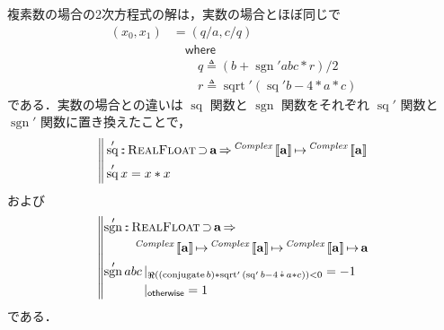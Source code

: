 \documentclass[a5paper,twoside,fleqn]{jsbook}
\def\[{\left[\!\left[}
\def\]{\right]\!\right]}
\DeclareMathOperator{\sgn}{sgn}
\newcommand{\mBrace}{\Vert}
\newcommand{\mKeyword}[1]{\mathsf{#1}} %
\newcommand{\mOtherwiseKeyword}{\mKeyword{otherwise}}
\newcommand{\mWhereKeyword}{\mKeyword{where}}
\DeclareMathOperator{\mOtherwise}{\mOtherwiseKeyword}
\DeclareMathOperator{\mSuperClass}{\Rightarrow}
\DeclareMathOperator{\mSuperSet}{\supset}
\DeclareMathOperator{\mWhere}{\mWhereKeyword}
\newcommand{\mSpecialFunc}[1]{\mathrm{#1}}
\DeclareMathOperator{\mConjugate}{\mSpecialFunc{conjugate}}
\DeclareMathOperator{\mRealPart}{\Re}
\DeclareMathOperator{\mSq}{\mSpecialFunc{sq}}
\DeclareMathOperator{\mSqrtFunc}{\mSpecialFunc{sqrt}}
\DeclareMathOperator{\mComplexTimes}{\Dot\ast}
\DeclareMathOperator{\mIn}{{:\!:}}
\DeclareMathOperator{\mLetEq}{\triangleq}
\DeclareMathOperator{\mMapsTo}{\mapsto}
\newcommand{\mType}[1]{\mathbf{#1}}
\newcommand{\mGenericTypeAssemble}[2]{{}^{\mTypeConstructor{#1}}\[\mType{#2}\]}
\newcommand{\mComplexType}[1]{\mGenericTypeAssemble{Complex}{#1}}
\newcommand{\mTypeConstructor}[1]{\textit{#1}}
\newcommand{\mTupleWith}[1]{\left(#1\right)}
\newcommand{\mGenericTypeClass}[1]{\textsc{#1}} %
\newcommand{\mRealFloatTypeClass}{\mGenericTypeClass{RealFloat}}
\newcommand{\mGuard}[1]{\mathop{\mid_{#1}}}
\newcommand{\mProj}[2]{#1\mMapsTo#2}
\begin{document}
複素数の場合の2次方程式の解は，実数の場合とほぼ同じで
\begin{equation}
\begin{aligned}
\mTupleWith{x_0,x_1}&=\mTupleWith{q/a,c/q}\\
&\quad\mWhere\\
&\qquad q\mLetEq\left(b+\sgn'abc*r\right)/2\\
&\qquad r\mLetEq\mSqrtFunc'{(\mSq'b-4*a*c)}
\end{aligned}
\end{equation}
である．実数の場合との違いは $\mSq$ 関数と $\sgn$ 関数をそれぞれ
$\mSq'$ 関数と $\sgn'$ 関数に置き換えたことで，
\begin{equation}
\left\mBrace
\begin{aligned}
&\mSq'\mIn\mRealFloatTypeClass\mSuperSet\mType{a}\mSuperClass\mProj{\mComplexType{a}}{\mComplexType{a}}\\
&\mSq'x=x*x
\end{aligned}
\right.
\end{equation}
および
\begin{equation}
\left\mBrace
\begin{aligned}
&\begin{aligned}
\sgn'&\mIn\mRealFloatTypeClass\mSuperSet\mType{a}\mSuperClass\\
&\quad\mProj{\mComplexType{a}}{\mProj{\mComplexType{a}}{\mProj{\mComplexType{a}}{\mType{a}}}}
\end{aligned}\\
&\begin{aligned}
\sgn'abc&\mGuard{\mRealPart((\mConjugate b)*\mSqrtFunc'{(\mSq' b-4\mComplexTimes a*c)})<0}=-1\\
&\mGuard{\mOtherwise}=1
\end{aligned}
\end{aligned}
\right.
\end{equation}
である．
\end{document}
